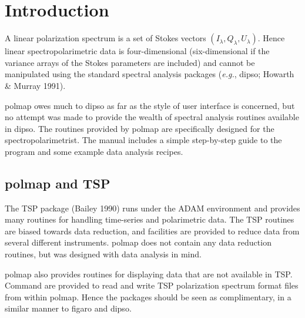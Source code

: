  \begin{latexonly}
   \setlength{\parskip}{0mm}
   \latexonlytoc
   \setlength{\parskip}{\medskipamount}
   \markright{\stardocname}
 \end{latexonly}
\newpage
\renewcommand{\thepage}{\arabic{page}}

\section{Introduction}

A linear polarization spectrum is a set of Stokes vectors
$(I_{\lambda},Q_{\lambda},U_{\lambda})$. Hence linear
spectropolarimetric data is four-dimensional (six-dimensional if the
variance arrays of the Stokes parameters are included) and cannot be
manipulated using the standard spectral analysis packages ({\em e.g.},
{\sc dipso}; Howarth \& Murray 1991). 

{\sc polmap} owes much to {\sc dipso} as far as the style of user
interface is concerned, but no attempt was made to provide the wealth
of spectral analysis routines available in {\sc dipso}. The routines
provided by {\sc polmap} are specifically designed for the
spectropolarimetrist. The manual includes a simple step-by-step guide
to the program and some example data analysis recipes.

\subsection{{\sc polmap} and TSP }

The TSP package (Bailey 1990) runs under the ADAM environment and
provides many routines for handling time-series and polarimetric data.
The TSP routines are biased towards data reduction, and facilities are
provided to reduce data from several different instruments. {\sc
polmap} does not contain any data reduction routines, but was designed
with data analysis in mind. 

{\sc polmap} also provides routines for displaying data that are not
available in TSP. Command are provided to read and write TSP
polarization spectrum format files from within {\sc polmap}.  Hence the
packages should be seen as complimentary, in a similar manner to {\sc figaro}
and {\sc dipso}.

